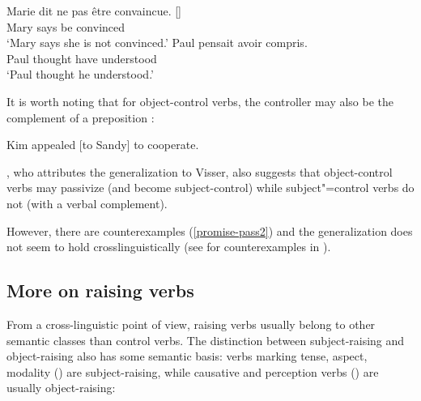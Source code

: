 \documentclass[output=paper
	        ,collection
	        ,collectionchapter
 	        ,biblatex
                ,babelshorthands
                ,newtxmath
                ,draftmode
                ,colorlinks, citecolor=brown
]{langscibook}
\begin{document}
\begin{exe}
\ex \begin{xlist}
\ex \gll Marie dit {ne pas} \^etre convaincue. [] \\
Mary says  be convinced \\
\glt `Mary says she is not convinced.'	
\ex \gll Paul pensait  avoir compris. \\
Paul thought have understood \\
\glt `Paul thought he understood.'
 \end{xlist}
\end{exe}

It is worth noting that for object-control verbs, the controller may also be the complement of a preposition \citep[]{PollardandSag1994}:

\begin{exe}
\ex Kim appealed [to Sandy] to cooperate. \label{to}
\end{exe}


 
\citet[]{Bresnan1982}, who attributes the generalization to Visser, also suggests that object-control verbs may passivize (and become subject-control) while subject"=control verbs do not (with a verbal complement).

\eal
{}\label{persuade-pass}
\label{promise-pass}
\label{promise-pass2}
\zl
However, there are counterexamples (\ref{promise-pass2}) and the generalization does not seem to hold crosslinguistically (see  for counterexamples in ).
 
\subsection{More on raising verbs}

From a cross-linguistic point of view, raising verbs usually belong to other semantic classes than control verbs. The distinction between subject-raising and object-raising also has some semantic basis: verbs marking tense, aspect, modality () are subject-raising, while
causative and perception verbs () are usually object-raising:
\end{document}
